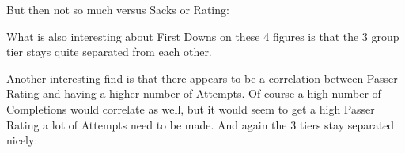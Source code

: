 \documentclass[10pt]{article}
\begin{document}
\par
But then not so much versus Sacks or Rating:
\par
{}%
\hfill
{}%
\par
What is also interesting about First Downs on these 4 figures is that the 3 group tier stays quite separated from each other.
\par Another interesting find is that there appears to be a correlation between Passer Rating and having a higher number of Attempts. Of course a high number of Completions would correlate as well, but it would seem to get a high Passer Rating a lot of Attempts need to be made. And again the 3 tiers stay separated nicely:
\par
{}%
\hfill
{}%
\end{document}
